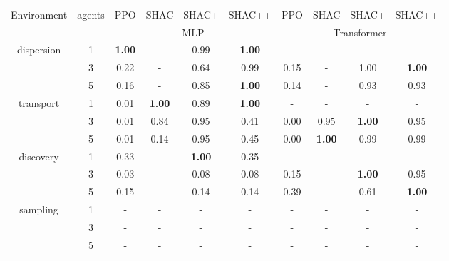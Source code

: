 \begin{tabular}{ c c c c c c c c c c }
\toprule
\multirow{2}{*}{Environment} & \multirow{2}{*}{agents} & PPO & SHAC & SHAC+ & SHAC++ & PPO & SHAC & SHAC+ & SHAC++ \\
 & & \multicolumn{4}{c}{MLP} & \multicolumn{4}{c}{Transformer} \\
\midrule
\multirow{3}{*}{dispersion}& 1 & \textbf{1.00} & - & 0.99 & \textbf{1.00} & - & - & - & - \\
& 3 & 0.22 & - & 0.64 & 0.99 & 0.15 & - & 1.00 & \textbf{1.00} \\
& 5 & 0.16 & - & 0.85 & \textbf{1.00} & 0.14 & - & 0.93 & 0.93 \\
\multirow{3}{*}{transport}& 1 & 0.01 & \textbf{1.00} & 0.89 & \textbf{1.00} & - & - & - & - \\
& 3 & 0.01 & 0.84 & 0.95 & 0.41 & 0.00 & 0.95 & \textbf{1.00} & 0.95 \\
& 5 & 0.01 & 0.14 & 0.95 & 0.45 & 0.00 & \textbf{1.00} & 0.99 & 0.99 \\
\multirow{3}{*}{discovery}& 1 & 0.33 & - & \textbf{1.00} & 0.35 & - & - & - & - \\
& 3 & 0.03 & - & 0.08 & 0.08 & 0.15 & - & \textbf{1.00} & 0.95 \\
& 5 & 0.15 & - & 0.14 & 0.14 & 0.39 & - & 0.61 & \textbf{1.00} \\
\multirow{3}{*}{sampling}& 1 & - & - & - & - & - & - & - & - \\
& 3 & - & - & - & - & - & - & - & - \\
& 5 & - & - & - & - & - & - & - & - \\
\bottomrule
\end{tabular}
